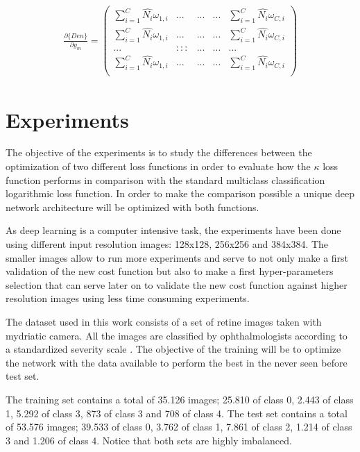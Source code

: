 \documentclass{IOS-Book-Article}
\begin{document}
\begin{equation*}
\begin{aligned}
\frac{\partial \{ Den\}}{\partial y_m} =
\begin{pmatrix} 
\sum_{i=1}^C \hat{N_i} \omega_{1,i} & ...  & ...     & ... & \sum_{i=1}^C \hat{N_i} \omega_{C,i}\\
\sum_{i=1}^C \hat{N_i} \omega_{1,i} & ...  & ...     & ... & \sum_{i=1}^C \hat{N_i} \omega_{C,i}\\
... & ::: & ... & ... & ...\\
\sum_{i=1}^C \hat{N_i} \omega_{1,i} & ...  & ...     & ... & \sum_{i=1}^C \hat{N_i} \omega_{C,i}\\ 
\end{pmatrix}
\end{aligned}
\end{equation*}


\section{Experiments}


The objective of the experiments is to study the differences between the optimization of two different loss functions in order to evaluate how the $\kappa$ loss function performs in comparison with the standard multiclass classification logarithmic loss function. In order to make the comparison possible a unique deep network architecture will be optimized with both functions. 

As deep learning is a computer intensive task, the experiments have been done using different input resolution images: 128x128, 256x256 and 384x384. The smaller images allow to run more experiments and serve to not only make a first validation of the new cost function but also to make a first hyper-parameters selection that can serve later on to validate the new cost function against higher resolution images using less time consuming experiments.

The dataset used in this work consists of a set of retine images taken with mydriatic camera. All the images are classified by ophthalmologists according to a standardized severity scale \cite{diaclass}. The objective of the training will be to optimize the network with the data available to perform the best in the never seen before test set.

The training set contains a total of 35.126 images; 25.810 of class 0, 2.443 of class 1, 5.292 of class 3, 873 of class 3 and 708 of class 4. The test set contains a total of 53.576 images; 39.533 of class 0, 3.762 of class 1, 7.861 of class 2, 1.214 of class 3 and 1.206 of class 4. Notice that both sets are highly imbalanced.
\end{document}
